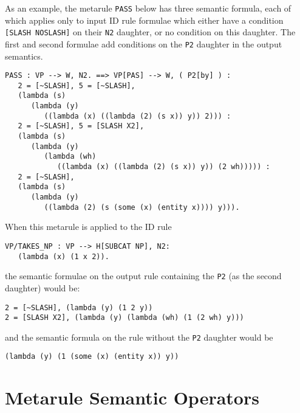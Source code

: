 As an example, the metarule {\tt PASS} below has three semantic formula,
each of which applies only to input ID rule formulae which either have
a condition {\tt [SLASH NOSLASH]} on their {\tt N2} daughter, or no condition
on this daughter. The first and second formulae add conditions on the {\tt P2}
daughter in the output semantics.
\begin{ex}
\begin{verbatim}
PASS : VP --> W, N2. ==> VP[PAS] --> W, ( P2[by] ) :
   2 = [~SLASH], 5 = [~SLASH],
   (lambda (s)
      (lambda (y)
         ((lambda (x) ((lambda (2) (s x)) y)) 2))) : 
   2 = [~SLASH], 5 = [SLASH X2],
   (lambda (s)
      (lambda (y)
         (lambda (wh)
            ((lambda (x) ((lambda (2) (s x)) y)) (2 wh))))) : 
   2 = [~SLASH],
   (lambda (s)
      (lambda (y)
         ((lambda (2) (s (some (x) (entity x)))) y))).
\end{verbatim}
\end{ex}
When this metarule is applied to the ID rule
\begin{ex}
\begin{verbatim}
VP/TAKES_NP : VP --> H[SUBCAT NP], N2:
   (lambda (x) (1 x 2)).
\end{verbatim}
\end{ex}
the semantic formulae on the output rule containing the {\tt P2} (as the
second daughter) would be:
\begin{ex}
\begin{verbatim}
2 = [~SLASH], (lambda (y) (1 2 y))
2 = [SLASH X2], (lambda (y) (lambda (wh) (1 (2 wh) y)))
\end{verbatim}
\end{ex}
and the semantic formula on the rule without the {\tt P2} daughter would be
\begin{ex}
\begin{verbatim}
(lambda (y) (1 (some (x) (entity x)) y))
\end{verbatim}
\end{ex}


\section*{Metarule Semantic Operators}

